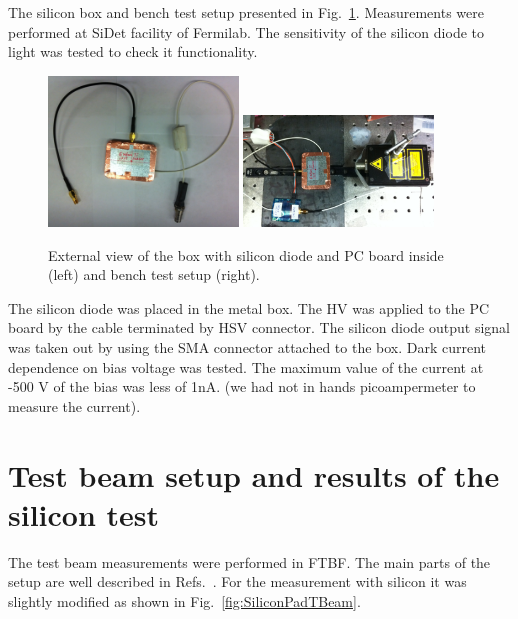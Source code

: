 \documentclass[12pt]{article}
\begin{document}
The silicon box and bench test setup presented in Fig.~\ref{fig:SiliconPad}. Measurements were performed at SiDet facility of Fermilab. The sensitivity of the silicon diode to light was tested to check it functionality.

\begin{figure}[htbp] 
\centering
\includegraphics[width=0.45\textwidth]{plots/SiliconPadExternalView.png} 
\includegraphics[width=0.45\textwidth]{plots/SiliconPadBench.png} 
\caption{External view of the box with silicon diode and PC board inside (left) and bench test setup (right).} 
\label{fig:SiliconPad} 
\end{figure} 

The silicon diode was placed in the metal box. The HV was applied to the PC
board by the cable terminated by HSV connector. The silicon diode output signal
was taken out by using the SMA connector attached to the box. Dark current
dependence on bias voltage was tested. The maximum value of the current at -500
V of the bias was less of 1nA. (we had not in hands picoampermeter to measure
the current). 


\section{Test beam setup and results of the silicon test }
\label{sec:tbeam}

The test beam measurements were performed in FTBF. The main parts of the setup are well described in Refs.~\cite{Anderson:2015gha, MCPFastCaloNIMA, Ronzhin2015288,
Ronzhin201552}. For the measurement with silicon it was slightly modified as shown in Fig.~\ref{fig:SiliconPadTBeam}.
\end{document}
